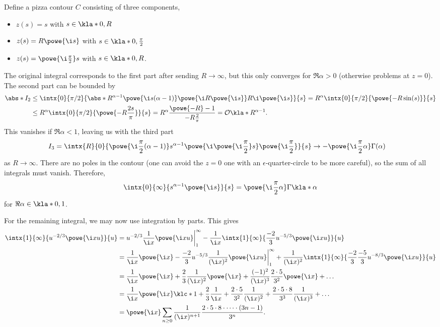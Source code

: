 \documentclass[english, parskip=full]{scrartcl}
\newcommand{\example}[3]{\begin{tcolorbox}[colback=colorbackgroundexample,colframe=colorexample, breakable,enhanced,title={\textbf{#1}: #2.}]#3\end{tcolorbox}}
\begin{document}
\example{Complex Gamma integral}{$\intx{0}{\infty}{z^{\alpha-1} \powe{\i z}}{z}$}{Define a pizza contour $C$ consisting of three components,
\begin{itemize}
\item $z(s)=s$ with $s\in\kla*{0,R}$
\item $z(s)=R\powe{\i s}$ with $s\in\kla*{0,\frac{\pi}{2}}$
\item $z(s)=\powe{\i \frac{\pi}{2}}s$ with $s\in\kla*{0,R}$.
\end{itemize}
The original integral corresponds to the first part after sending $R\rightarrow\infty$, but this only converges for $\Re\alpha > 0$ (otherwise problems at $z=0$).
The second part can be bounded by
\begin{align}
\abs*{I_2} &\le \intx{0}{\pi/2}{ \abs*{R^{\alpha-1} \powe{\i s(\alpha-1)} \powe{\i R\powe{\i s}} R\i \powe{\i s}} }{s} = R^\alpha \intx{0}{\pi/2}{\powe{-R\sin(s)}}{s}\\
&\le R^\alpha \intx{0}{\pi/2}{\powe{-R \frac{2s}{\pi}}}{s} = R^\alpha \frac{\powe{-R} - 1}{-R \frac{2}{\pi}} = \mathcal{O}\kla*{R^{\alpha-1}}.
\end{align}
This vanishes if $\Re \alpha < 1$, leaving us with the third part
\begin{align}
I_3 &= \intx{R}{0}{ \powe{\i \frac{\pi}{2}(\alpha-1)} s^{\alpha-1} \powe{\i \powe{\i \frac{\pi}{2}}s} \powe{\i\frac{\pi}{2}}}{s} \rightarrow -\powe{\i \frac{\pi}{2}\alpha} \Gamma(\alpha)
\end{align}
as $R\rightarrow\infty$.
There are no poles in the contour (one can avoid the $z=0$ one with an $\epsilon$-quarter-circle to be more careful), so the sum of all integrals must vanish.
Therefore,
\begin{align}
\intx{0}{\infty}{s^{\alpha-1} \powe{\i s}}{s} = \powe{\i\frac{\pi}{2}\alpha} \Gamma\kla*{\alpha}
\end{align}
for $\Re\alpha\in\kla*{0,1}$.
}
For the remaining integral, we may now use integration by parts.
This gives
\begin{align}
\intx{1}{\infty}{u^{-2/3} \powe{\i xu}}{u} &= u^{-2/3} \frac{1}{\i x} \powe{\i xu} \bigg\vert_1^\infty - \frac{1}{\i x} \intx{1}{\infty}{\frac{-2}{3} u^{-5/3} \powe{\i xu}}{u}\\
&= \frac{1}{\i x} \powe{\i x} - \frac{-2}{3} u^{-5/3} \frac{1}{(\i x)^2} \powe{\i xu}\bigg\vert_1^\infty + \frac{1}{(\i x)^2} \intx{1}{\infty}{\frac{-2}{3} \frac{-5}{3} u^{-8/3} \powe{\i xu}}{u}\\
&= \frac{1}{\i x} \powe{\i x} + \frac{2}{3} \frac{1}{(\i x)^2} \powe{\i x} + \frac{(-1)^2}{(\i x)^3} \frac{2\cdot 5}{3^2} \powe{\i x} + \dots\\
&= \frac{1}{\i x} \powe{\i x} \klc*{1 + \frac{2}{3} \frac{1}{\i x} + \frac{2\cdot 5}{3^2} \frac{1}{(\i x)^2} + \frac{2\cdot 5 \cdot 8}{3^3} \frac{1}{(\i x)^3} + \dots} \\
&= \powe{\i x} \sum_{n\ge 0} \frac{1}{(\i x)^{n+1}} \frac{2\cdot 5 \cdot 8 \cdot \dots \cdot (3n-1)}{3^n}.
\end{align}
\end{document}

